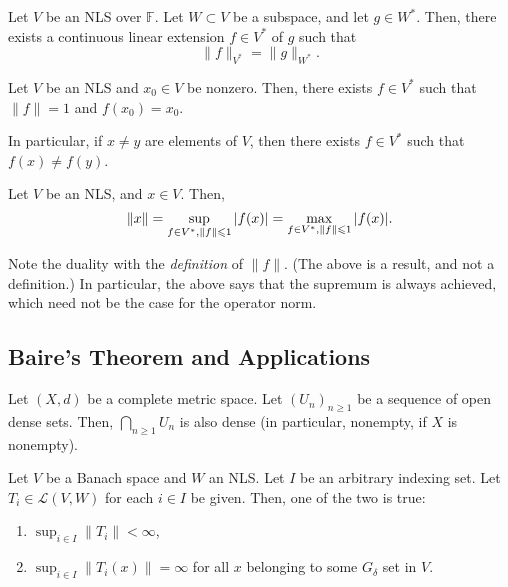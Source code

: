 \documentclass[12pt]{article}	%
\begin{document}
\begin{cor}
	Let $V$ be an NLS over $\mathbb{F}$. Let $W \subset V$ be a subspace, and let $g \in W^{\ast}$. Then, there exists a continuous linear extension $f \in V^{\ast}$ of $g$ such that
	\begin{equation*} 
		\|f\|_{V^{\ast}} = \|g\|_{W^{\ast}}.
	\end{equation*}
\end{cor}

\begin{cor}
	Let $V$ be an NLS and $x_{0} \in V$ be nonzero. Then, there exists $f \in V^{\ast}$ such that $\|f\| = 1$ and $f(x_{0}) = x_{0}$.

	In particular, if $x \neq y$ are elements of $V$, then there exists $f \in V^{\ast}$ such that $f(x) \neq f(y)$.
\end{cor}

\begin{cor}
	Let $V$ be an NLS, and $x \in V$. Then,
	\begin{equation*} 
		\|x\| = \sup_{f \in V^{\ast}, \|f\| \leqslant 1} {\left\lvert f(x) \right\lvert} = \max_{f \in V^{\ast}, \|f\| \leqslant 1} {\left\lvert f(x) \right\lvert}.
	\end{equation*}
\end{cor}
Note the duality with the \emph{definition} of $\|f\|$. (The above is a result, and not a definition.) In particular, the above says that the supremum is always achieved, which need not be the case for the operator norm.

\subsection{Baire's Theorem and Applications}

\begin{thm}
	Let $(X, d)$ be a complete metric space. Let $(U_{n})_{n \ge 1}$ be a sequence of open dense sets. Then, $\bigcap_{n \ge 1} U_{n}$ is also dense (in particular, nonempty, if $X$ is nonempty).
\end{thm}

\begin{thm}
	Let $V$ be a Banach space and $W$ an NLS. Let $I$ be an arbitrary indexing set. Let $T_{i} \in \mathcal{L}(V, W)$ for each $i \in I$ be given. Then, one of the two is true:
	\begin{enumerate}
		\item $\sup_{i \in I} \|T_{i}\| < \infty$,
		\item $\sup_{i \in I} \|T_{i}(x)\| = \infty$ for all $x$ belonging to some $G_{\delta}$ set in $V$.
	\end{enumerate}
\end{thm}
\end{document}
